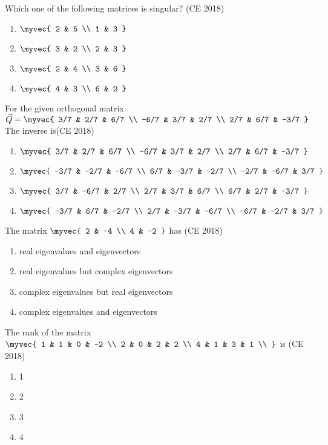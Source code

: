 \item Which one of the following matrices is singular?
\hfill{(CE 2018)}
\begin{multicols}{4}
\begin{enumerate}
    \item $\myvec{ 2 & 5 \\ 1 & 3 }$
    \item $\myvec{ 3 & 2 \\ 2 & 3 }$
    \item $\myvec{ 2 & 4 \\ 3 & 6 }$
    \item $\myvec{ 4 & 3 \\ 6 & 2 }$
\end{enumerate}
\end{multicols}
\item For the given orthogonal matrix 
$\vec{Q} =
\myvec{
3/7 & 2/7 & 6/7 \\
-6/7 & 3/7 & 2/7 \\
2/7 & 6/7 & -3/7
}
$
The inverse is\hfill{(CE 2018)}
\begin{multicols}{2}
\begin{enumerate}
    \item
    $\myvec{
    3/7 & 2/7 & 6/7 \\
    -6/7 & 3/7 & 2/7 \\
    2/7 & 6/7 & -3/7
    }$
    \item
    $\myvec{
    -3/7 & -2/7 & -6/7 \\
    6/7 & -3/7 & -2/7 \\
    -2/7 & -6/7 & 3/7
    }$
    \item
    $\myvec{
    3/7 & -6/7 & 2/7 \\
    2/7 & 3/7 & 6/7 \\
    6/7 & 2/7 & -3/7
    }$
    \item
    $\myvec{
    -3/7 & 6/7 & -2/7 \\
    2/7 & -3/7 & -6/7 \\
    -6/7 & -2/7 & 3/7
    }$
\end{enumerate}
\end{multicols}
\item The matrix $
\myvec{
2 & -4 \\
4 & -2
}
$ has
\hfill{(CE 2018)}
\begin{enumerate}
    \item real eigenvalues and eigenvectors
    \item real eigenvalues but complex eigenvectors
    \item complex eigenvalues but real eigenvectors
    \item complex eigenvalues and eigenvectors
\end{enumerate}
\item The rank of the matrix 
$
\myvec{
1 & 1 & 0 & -2 \\
2 & 0 & 2 & 2 \\
4 & 1 & 3 & 1 \\
}
$
is
\hfill{(CE 2018)}
\begin{multicols}{4}
\begin{enumerate}
    \item 1
    \item 2
    \item 3
    \item 4
\end{enumerate}
\end{multicols}
